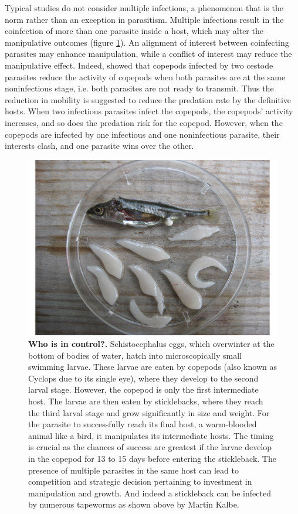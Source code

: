 \documentclass[a4paper]{scrartcl} %
\begin{document}
Typical studies do not consider multiple infections, a phenomenon that is the norm rather than an exception in parasitism. 
Multiple infections result in the coinfection of more than one parasite inside a host, which may alter the manipulative outcomes (figure \ref{fig:empirical}). 
An alignment of interest between coinfecting parasites may enhance manipulation, while a conflict of interest may reduce the manipulative effect. 
Indeed, \cite{Hafer:2015gl} showed that copepods infected by two cestode parasites reduce the activity of copepods when both parasites are at the same noninfectious stage, i.e. both parasites are not ready to transmit. 
Thus the reduction in mobility is suggested to reduce the predation rate by the definitive hosts. 
When two infectious parasites infect the copepods, the copepods' activity increases, and so does the predation risk for the copepod. 
However, when the copepods are infected by one infectious and one noninfectious parasite, their interests clash, and one parasite wins over the other. 

\begin{figure}[ht!]
\centering
\includegraphics[width=0.75\columnwidth]{Figures/Sept_10_ 101.pdf}
\caption{\textbf{Who is in control?.}
Schistocephalus eggs, which overwinter at the bottom of bodies of water, hatch into microscopically small swimming larvae. 
These larvae are eaten by copepods (also known as Cyclops due to its single eye), where they develop to the second larval stage. 
However, the copepod is only the first intermediate host. 
The larvae are then eaten by sticklebacks, where they reach the third larval stage and grow significantly in size and weight. 
For the parasite to successfully reach its final host, a warm-blooded animal like a bird, it manipulates its intermediate hosts. 
The timing is crucial as the chances of success are greatest if the larvae develop in the copepod for 13 to 15 days before entering the stickleback. 
The presence of multiple parasites in the same host can lead to competition and strategic decision pertaining to investment in manipulation and growth.
And indeed a stickleback can be infected by numerous tapeworms as shown above by Martin Kalbe.
}
\label{fig:empirical}
\end{figure}
\end{document}
